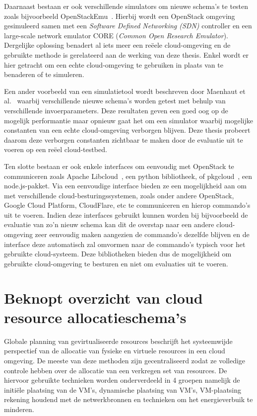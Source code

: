 Daarnaast bestaan er ook verschillende simulators om nieuwe schema's te testen zoals bijvoorbeeld OpenStackEmu~\cite{Benet2017}. Hierbij wordt een OpenStack omgeving gesimuleerd samen met een \textit{Software Defined Networking (SDN)} controller en een large-scale network emulator CORE (\textit{Common Open Research Emulator}). Dergelijke oplossing benadert al iets meer een reëele cloud-omgeving en de gebruikte methode is gerelateerd aan de werking van deze thesis. Enkel wordt er hier getracht om een echte cloud-omgeving te gebruiken in plaats van te benaderen of te simuleren.

Een ander voorbeeld van een simulatietool wordt beschreven door Maenhaut et al.~\cite{Maenhaut2016} waarbij verschillende nieuwe schema's worden getest met behulp van verschillende invoerparameters. Deze resultaten geven een goed oog op de mogelijk performantie maar opnieuw gaat het om een simulator waarbij mogelijke constanten van een echte cloud-omgeving verborgen blijven. Deze thesis probeert daarom deze verborgen constanten zichtbaar te maken door de evaluatie uit te voeren op een reëel cloud-testbed.

Ten slotte bestaan er ook enkele interfaces om eenvoudig met OpenStack te communiceren zoals Apache Libcloud~\cite{Libcloud}, een python bibliotheek, of pkgcloud~\cite{pkgcloud}, een node.js-pakket. Via een eenvoudige interface bieden ze een mogelijkheid aan om met verschillende cloud-besturingssystemen, zoals onder andere OpenStack, Google Cloud Platform, CloudFlare, etc te communiceren en hierop commando's uit te voeren. Indien deze interfaces gebruikt kunnen worden bij bijvoorbeeld de evaluatie van zo'n nieuw schema kan dit de overstap naar een andere cloud-omgeving zeer eenvoudig maken aangezien de commando's dezelfde blijven en de interface deze automatisch zal omvormen naar de commando's typisch voor het gebruikte cloud-systeem. Deze bibliotheken bieden dus de mogelijkheid om gebruikte cloud-omgeving te besturen en niet om evaluaties uit te voeren.

\section{Beknopt overzicht van cloud resource allocatieschema's}
\label{sec:newcras}

Globale planning van gevirtualiseerde resources beschrijft het systeemwijde perspectief van de allocatie van fysieke en virtuele resources in een cloud omgeving. De meeste van deze methoden zijn gecentraliseerd zodat ze volledige controle hebben over de allocatie van een verkregen set van resources. De hiervoor gebruikte technieken worden onderverdeeld in 4 groepen namelijk de initiële plaatsing van de VM's, dynamische plaatsing van VM's, VM-plaatsing rekening houdend met de netwerkbronnen en technieken om het energieverbuik te minderen.

